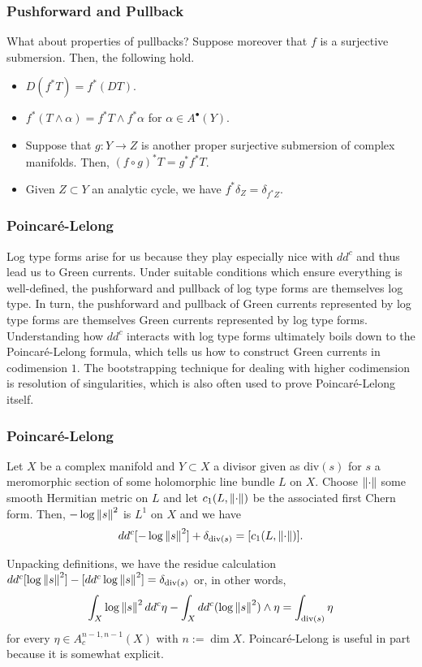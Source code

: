 \documentclass[11pt]{beamer}
\renewcommand{\div}{\mathrm{div}}
\begin{document}
\begin{frame}
\frametitle{Pushforward and Pullback}
What about properties of pullbacks? Suppose moreover that $f$ is a surjective submersion. Then, the following hold.
\begin{itemize}
\item $D(f^*T)=f^*(DT)$.

\item $f^*(T\wedge\alpha)=f^*T\wedge f^*\alpha$ for $\alpha\in A^{\bullet}(Y)$.

\item Suppose that $g: Y\to Z$ is another proper surjective submersion of complex manifolds. Then, $(f\circ g)^*T=g^*f^*T$.

\item Given $Z\subset Y$ an analytic cycle, we have $f^*\delta_Z=\delta_{f^*Z}$.
\end{itemize}
\end{frame}

\begin{frame}
\frametitle{Poincar\'{e}-Lelong}
Log type forms arise for us because they play especially nice with $dd^c$ and thus lead us to Green currents. Under suitable conditions which ensure everything is well-defined, the pushforward and pullback of log type forms are themselves log type. In turn, the pushforward and pullback of Green currents represented by log type forms are themselves Green currents represented by log type forms. Understanding how $dd^c$ interacts with log type forms ultimately boils down to the Poincar\'{e}-Lelong formula, which tells us how to construct Green currents in codimension $1$. The bootstrapping technique for dealing with higher codimension is resolution of singularities, which is also often used to prove Poincar\'{e}-Lelong itself.
\end{frame}

\begin{frame}
\frametitle{Poincar\'{e}-Lelong}
\begin{theorem}
Let $X$ be a complex manifold and $Y\subset X$ a divisor given as $\div(s)$ for $s$ a meromorphic section of some holomorphic line bundle $L$ on $X$. Choose $\left\lVert\cdot\right\rVert$ some smooth Hermitian metric on $L$ and let $c_1(L,\left\lVert\cdot\right\rVert)$ be the associated first Chern form. Then, $-\log\left\lVert s\right\rVert^2$ is $L^1$ on $X$ and we have
$$dd^c[-\log\norm{s}^2]+\delta_{\div(s)}=[c_1(L,\norm{\cdot})].$$
\end{theorem}

Unpacking definitions, we have the residue calculation $dd^c[\log\norm{s}^2]-[dd^c\log\norm{s}^2]=\delta_{\div(s)}$ or, in other words,
$$\int_X\log\norm{s}^2dd^c\eta-\int_Xdd^c(\log\norm{s}^2)\wedge\eta=\int_{\div(s)}\eta$$
for every $\eta\in A_c^{n-1,n-1}(X)$ with $n:=\dim X$. Poincar\'{e}-Lelong is useful in part because it is somewhat explicit.
\end{frame}
\end{document}
